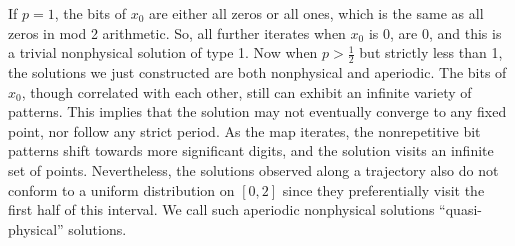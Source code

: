 \documentclass[preprint,12pt]{elsarticle}
\begin{document}
If $p = 1$, the bits of $x_0$ are either all zeros or all ones, which is the same as all zeros in mod 2 arithmetic. So, all further iterates when $x_0$ is 0, are 0, and this is a trivial nonphysical solution of type 1.  Now when $p > \frac12$ but strictly less than 1, 
the solutions we just constructed are both nonphysical and aperiodic.
The bits of $x_0$, though correlated with each other,
still can exhibit an infinite variety of patterns. 
This implies that the solution may not eventually converge to 
any fixed point, nor follow any strict period.  
 As the map iterates, the nonrepetitive bit patterns
shift towards more significant digits, and the solution visits an infinite set of
points. 
 Nevertheless, the solutions observed along a trajectory also 
 do not conform to a uniform distribution on $[0,2]$ since they 
 preferentially visit the first half of this interval.
We call such aperiodic nonphysical solutions ``quasi-physical'' solutions.
\end{document}
